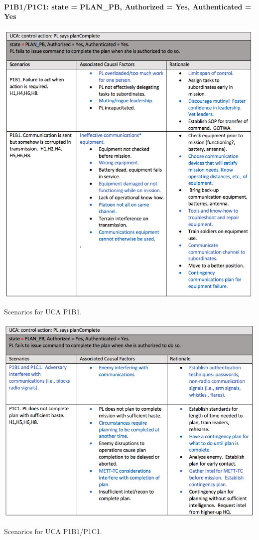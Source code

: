 \documentclass[../../main/main.tex]{subfiles}
\begin{document}
\paragraph*{P1B1/P1C1: state = PLAN_PB, Authorized = Yes, Authenticated = Yes}

\begin{table}[ht!]
\begin{center}
\includegraphics[width=\linewidth]{../figures/ucap1b1}
\caption{Scenarios for UCA P1B1.}
\label{ucap1b1}
\end{center}
\end{table}
\clearpage


\begin{table}[ht!]
\begin{center}
\includegraphics[width=\linewidth]{../figures/ucap1b1p1c1}
\caption{Scenarios for UCA P1B1/P1C1.}
\label{ucap1b1p1c1}
\end{center}
\end{table}
\clearpage
\end{document}
